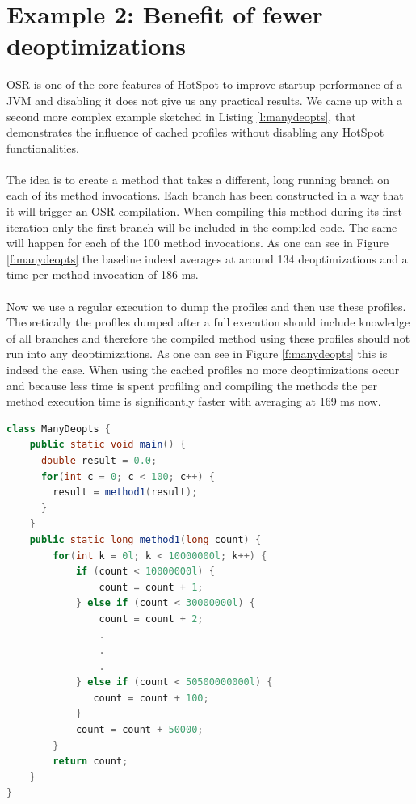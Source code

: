 \section{Example 2: Benefit of fewer deoptimizations}
\label{s:ex2}
OSR is one of the core features of HotSpot to improve startup performance of a JVM and disabling it does not give us any practical results. We came up with a second more complex example sketched in Listing \ref{l:manydeopts}, that demonstrates the influence of cached profiles without disabling any HotSpot functionalities.
\\\\
The idea is to create a method that takes a different, long running branch on each of its method invocations. Each branch has been constructed in a way that it will trigger an OSR compilation. When compiling this method during its first iteration only the first branch will be included in the compiled code. The same will happen for each of the 100 method invocations. As one can see in Figure \ref{f:manydeopts} the baseline indeed averages at around 134 deoptimizations and a time per method invocation of 186 ms.
\\\\
Now we use a regular execution to dump the profiles and then use these profiles. Theoretically the profiles dumped after a full execution should include knowledge of all branches and therefore the compiled method using these profiles should not run into any deoptimizations. As one can see in Figure \ref{f:manydeopts} this is indeed the case. When using the cached profiles no more deoptimizations occur and because less time is spent profiling and compiling the methods the per method execution time is significantly faster with averaging at 169 ms now.
\begin{lstlisting}[float,caption=Simple method that causes many deoptimizations,label=l:manydeopts,language=Java]
class ManyDeopts {
    public static void main() {
      double result = 0.0;
      for(int c = 0; c < 100; c++) {
        result = method1(result);
      }
    }
    public static long method1(long count) {
        for(int k = 0l; k < 10000000l; k++) {
            if (count < 10000000l) {
                count = count + 1;
            } else if (count < 30000000l) {
                count = count + 2;
                .
                .
                .
            } else if (count < 50500000000l) {
               count = count + 100;
            }
            count = count + 50000;
        }
        return count;
    }
}
\end{lstlisting}
